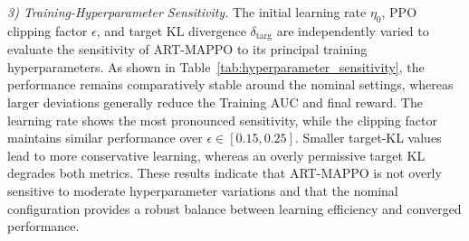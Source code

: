 \documentclass[lettersize,journal]{IEEEtran}
\newcommand{\hladd}[1]{{\color{blue}#1}}
\begin{document}
\hladd{\emph{3) Training-Hyperparameter Sensitivity.}
The initial learning rate $\eta_0$, PPO clipping factor $\epsilon$, and
target KL divergence $\delta_{\mathrm{targ}}$ are independently varied to
evaluate the sensitivity of ART-MAPPO to its principal training
hyperparameters. As shown in Table~\ref{tab:hyperparameter_sensitivity}, the
performance remains comparatively stable around the nominal settings, whereas
larger deviations generally reduce the Training AUC and final reward. The
learning rate shows the most pronounced sensitivity, while the clipping factor
maintains similar performance over $\epsilon\in[0.15,0.25]$. Smaller target-KL
values lead to more conservative learning, whereas an overly permissive target
KL degrades both metrics. These results indicate that ART-MAPPO is not overly
sensitive to moderate hyperparameter variations and that the nominal
configuration provides a robust balance between learning efficiency and
converged performance.}
\end{document}
